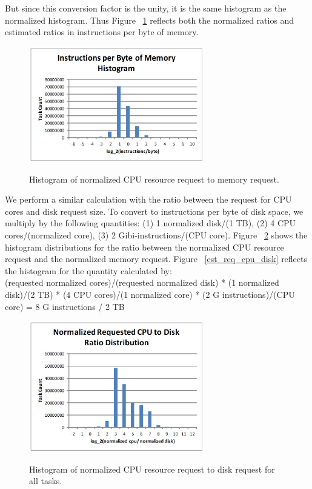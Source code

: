 \documentclass{sig-alternate}
\begin{document}
But since this conversion factor is the unity, it is the same histogram as the normalized histogram.
Thus Figure ~\ref{req_cpu_mem} reflects both the normalized ratios and estimated ratios in instructions per byte of memory.

\begin{figure}
\centering
\includegraphics[width=3in]{../figures/req_cpu_mem.jpg}
\label{req_cpu_mem}
\caption{Histogram of normalized CPU resource request to memory request.}
\end{figure}

We perform a similar calculation with the ratio between the request for CPU cores and disk request size.
To convert to instructions per byte of disk space, we multiply by the following quantities: (1) 1 normalized disk/(1 TB), (2) 4 CPU cores/(normalized core), (3) 2 Gibi-instructions/(CPU core).
Figure ~\ref{req_cpu_disk} shows the histogram distributions for the ratio between the normalized CPU resource request and the normalized memory request.
Figure ~\ref{est_req_cpu_disk} reflects the histogram for the quantity calculated by: \\
(requested normalized cores)/(requested normalized disk) * (1 normalized disk)/(2 TB) * (4 CPU cores)/(1 normalized core) * (2 G instructions)/(CPU core) = 8 G instructions / 2 TB

\begin{figure}
\centering
\includegraphics[width=3in]{../figures/req_cpu_disk.jpg}
\label{req_cpu_disk}
\caption{Histogram of normalized CPU resource request to disk request for all tasks.}
\end{figure}
\end{document}
